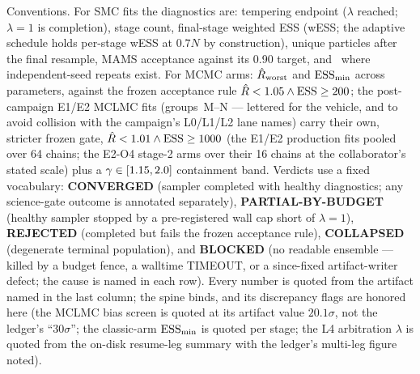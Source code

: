 Conventions. For SMC fits the diagnostics are: tempering endpoint
($\lambda$ reached; $\lambda{=}1$ is completion), stage count, final-stage
weighted ESS (wESS; the adaptive schedule holds per-stage wESS at $0.7N$ by
construction), unique particles after the final resample, MAMS acceptance
against its 0.90 target, and \sseed\ where independent-seed repeats exist.
For MCMC arms: $\hat{R}_{\rm worst}$ and $\textrm{ESS}_{\min}$ across parameters,
against the frozen acceptance rule $\hat{R}<1.05 \wedge \textrm{ESS}\ge200$; the
post-campaign E1/E2 MCLMC fits (groups~M--N --- lettered for the vehicle,
and to avoid collision with the campaign's L0/L1/L2 lane names) carry
their own, stricter frozen gate, $\hat{R}<1.01 \wedge \textrm{ESS}\ge1000$ (the
E1/E2 production fits pooled over 64 chains; the E2-O4 stage-2 arms over
their 16 chains at the collaborator's stated scale) plus a
$\gamma\in[1.15,2.0]$ containment band. Verdicts
use a fixed vocabulary: {\bf CONVERGED} (sampler completed with healthy
diagnostics; any science-gate outcome is annotated separately), {\bf
PARTIAL-BY-BUDGET} (healthy sampler stopped by a pre-registered wall cap
short of $\lambda{=}1$), {\bf REJECTED} (completed but fails the frozen
acceptance rule), {\bf COLLAPSED} (degenerate terminal population), and
{\bf BLOCKED} (no readable ensemble --- killed by a budget fence, a
walltime TIMEOUT, or a since-fixed artifact-writer defect; the cause is
named in each row). Every
number is quoted from the artifact named in the last column; the spine
 binds, and its discrepancy flags are
honored here (the MCLMC bias screen is quoted at its artifact value
$20.1\sigma$, not the ledger's ``30$\sigma$''; the classic-arm
$\textrm{ESS}_{\min}$ is quoted per stage; the L4 arbitration $\lambda$ is quoted
from the on-disk resume-leg summary with the ledger's multi-leg figure
noted).

\newlength{\cglgrpw}
\newcommand{\cglgrouprow}[1]{\multicolumn{7}{l}{\parbox[b]{\cglgrpw}{\raggedright\textbf{#1}\strut}}}

